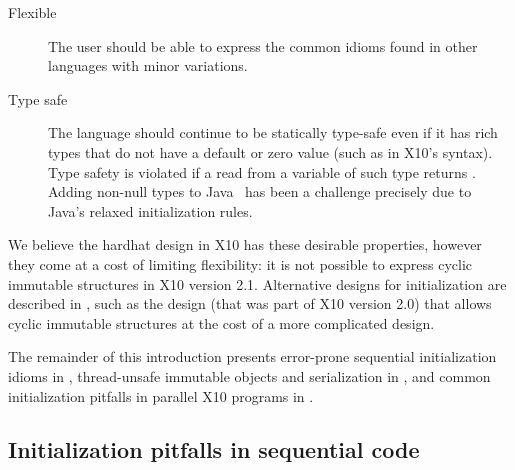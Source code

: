 \begin{description}
  \item[Flexible]
    The user should be able to express the common idioms
        found in other languages with minor variations.

  \item[Type safe]
    The language should continue to be statically type-safe even
        if it has rich types that do not have a default or zero value (such as  in X10's syntax).
    Type safety is violated if a read from a variable of such type returns .
    Adding non-null types to Java~\cite{Fahndrich:2003:DCN:949305.949332,Fahndrich:2007:EOI:1297027.1297052,XinQi:2009}
        has been a challenge precisely due to
        Java's relaxed initialization rules.
\end{description}
We believe the hardhat design in X10 has these desirable properties,
    however they come at a cost of limiting flexibility:
    it is not possible to express cyclic immutable structures in X10 version 2.1.
Alternative designs for initialization are described in ,
    such as the  design (that was part of X10 version 2.0) that allows cyclic immutable structures
    at the cost of a more complicated design.

The remainder of this introduction
    presents error-prone sequential initialization idioms in ,
    thread-unsafe immutable objects and serialization in , and
    common initialization pitfalls in parallel X10 programs in .

\subsection{Initialization pitfalls in sequential code}
\label{Section:Initialization-pitfalls}

